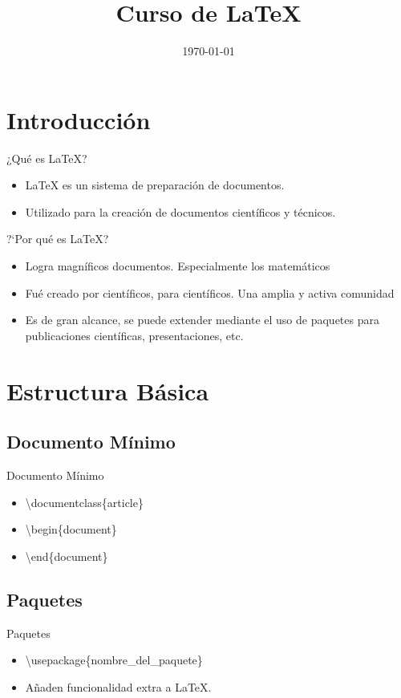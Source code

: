 \documentclass[12]{beamer}
\title{Curso de LaTeX}
\date{\today}
\begin{document}
\frame{\titlepage}

\section{Introducción}
\begin{frame}{¿Qué es LaTeX?}
  \begin{itemize}
    \item LaTeX es un sistema de preparación de documentos.
    \item Utilizado para la creación de documentos científicos y técnicos.
  \end{itemize}
\end{frame}
\begin{frame}{?`Por qu\'e es LaTeX?}
  \begin{itemize}
    \item Logra magn\'ificos documentos. Especialmente los matem\'aticos
    \item Fu\'e creado por cient\'ificos, para cient\'ificos. Una amplia y activa comunidad
    \item Es de gran alcance, se puede extender mediante el uso de paquetes para publicaciones cient\'ificas, presentaciones, etc.

  \end{itemize}
\end{frame}

\section{Estructura Básica}
\subsection{Documento Mínimo}
\begin{frame}{Documento Mínimo}
  \begin{itemize}
    \item \textbackslash documentclass\{article\}
    \item \textbackslash begin\{document\}
    \item \textbackslash end\{document\}
  \end{itemize}
\end{frame}

\subsection{Paquetes}
\begin{frame}{Paquetes}
  \begin{itemize}
    \item \textbackslash usepackage\{nombre\_del\_paquete\}
    \item Añaden funcionalidad extra a LaTeX.
  \end{itemize}
\end{frame}
\end{document}
